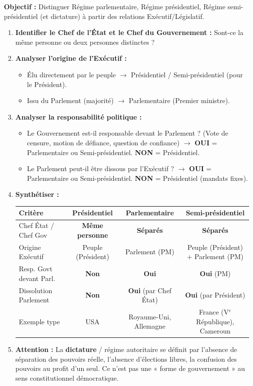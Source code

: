 \documentclass[11pt]{article}
\begin{document}
\begin{methode}
\textbf{Objectif :} Distinguer Régime parlementaire, Régime présidentiel, Régime semi-présidentiel (et dictature) à partir des relations Exécutif/Législatif.
\begin{enumerate}
    \item \textbf{Identifier le Chef de l'État et le Chef du Gouvernement :} Sont-ce la même personne ou deux personnes distinctes ?
    \item \textbf{Analyser l'origine de l'Exécutif :}
    \begin{itemize}
        \item Élu directement par le peuple $\rightarrow$ Présidentiel / Semi-présidentiel (pour le Président).
        \item Issu du Parlement (majorité) $\rightarrow$ Parlementaire (Premier ministre).
    \end{itemize}
    \item \textbf{Analyser la responsabilité politique :}
    \begin{itemize}
        \item Le Gouvernement est-il responsable devant le Parlement ? (Vote de censure, motion de défiance, question de confiance) $\rightarrow$ \textbf{OUI} = Parlementaire ou Semi-présidentiel. \textbf{NON} = Présidentiel.
        \item Le Parlement peut-il être dissous par l'Exécutif ? $\rightarrow$ \textbf{OUI} = Parlementaire ou Semi-présidentiel. \textbf{NON} = Présidentiel (mandats fixes).
    \end{itemize}
    \item \textbf{Synthétiser :}
    \begin{center}
    \begin{tabular}{|l|c|c|c|}\hline
    \textbf{Critère} & \textbf{Présidentiel} & \textbf{Parlementaire} & \textbf{Semi-présidentiel} \\ \hline
    Chef État / Chef Gov & \textbf{Même personne} & \textbf{Séparés} & \textbf{Séparés} \\ \hline
    Origine Exécutif & Peuple (Président) & Parlement (PM) & Peuple (Président) + Parlement (PM) \\ \hline
    Resp. Govt devant Parl. & \textbf{Non} & \textbf{Oui} & \textbf{Oui} (PM) \\ \hline
    Dissolution Parlement & \textbf{Non} & \textbf{Oui} (par Chef État) & \textbf{Oui} (par Président) \\ \hline
    Exemple type & USA & Royaume-Uni, Allemagne & France (V$^e$ République), Cameroun \\ \hline
    \end{tabular}
    \end{center}
    \item \textbf{Attention :} La \textbf{dictature} / régime autoritaire se définit par l'absence de séparation des pouvoirs réelle, l'absence d'élections libres, la confusion des pouvoirs au profit d'un seul. Ce n'est pas une « forme de gouvernement » au sens constitutionnel démocratique.
\end{enumerate}
\end{methode}
\end{document}
